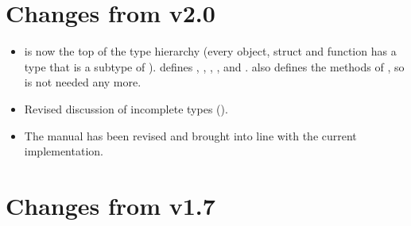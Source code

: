 \documentclass[12pt,twoside,notitlepage]{report}
\begin{document}
\section{Changes from \Xten{} v2.0}

\begin{itemize}
\item {} is now the top of the type hierarchy (every object,
  struct and function has a type that is a subtype of
  ).  defines , , ,
  ,  and .  also defines the methods
  of , so  is not needed any more.
\item Revised discussion of incomplete types ().
\item The manual has been revised and brought into line with the current implementation. 
\end{itemize}
\section{Changes from \Xten{} v1.7}
\end{document}
